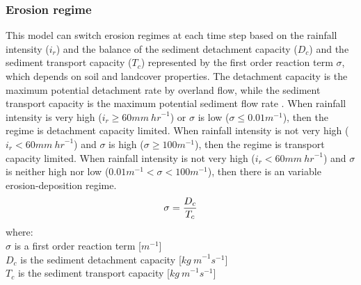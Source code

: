 \documentclass[gmd, manuscript]{copernicus}
\begin{document}




\subsubsection{Erosion regime}

This model can switch erosion regimes at each time step
based on the rainfall intensity ($i_r$)
and the balance of the sediment detachment capacity ($D_c$)
and the sediment transport capacity ($T_c$)
represented by the first order reaction term $\sigma$, 
which depends on soil and landcover properties.
The detachment capacity is the maximum potential 
detachment rate by overland flow, while
the sediment transport capacity 
is the maximum potential sediment flow rate 
\citep{Mitasova2001}.
When rainfall intensity is very high ($i_r \geq 60 \unit{mm~hr}^{-1}$)
or $\sigma$ is low ($\sigma \leq 0.01 \unit{m}^{-1}$),
then the regime is detachment capacity limited. 
%
When rainfall intensity is not very high ($i_r < 60 \unit{mm~hr}^{-1} $)
and $\sigma$ is high ($\sigma \geq 100 \unit{m}^{-1}$),
then the regime is transport capacity limited. 
%
When rainfall intensity is not very high 
($i_r<60 \unit{mm~hr}^{-1}$)
and $\sigma$ is neither high nor low 
($ 0.01 \unit{m}^{-1}< \sigma < 100 \unit{m}^{-1}$),
then there is an variable erosion-deposition regime. \\
\begin{equation}
\label{eq:regime}
\sigma = {D_c \over T_c}
\end{equation}
{\small
\noindent
where: \\
\noindent
\hspace*{0.5em} $\sigma$  is a first order reaction term [$\unit{m}^{-1}$]\\
\hspace*{0.5em} $D_c$ is the sediment detachment capacity [$\unit{kg~m}^{-1}s^{-1}$]\\
\hspace*{0.5em} $T_c$ is the sediment transport capacity [$\unit{kg~m}^{-1}s^{-1}$]\\
}
\end{document}
